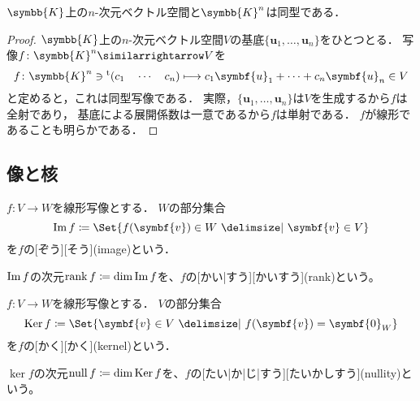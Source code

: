 \documentclass[../sotsu.tex]{subfiles}
\begin{document}
\begin{theorem}
    $\symbb{K}$上の$n$-次元ベクトル空間と$\symbb{K}^n$は同型である\cite{saito-lin-2007}．
\end{theorem}

\begin{proof}
    $\symbb{K}$上の$n$-次元ベクトル空間$V$の基底$\{\symbf{u}_1, \dots, \symbf{u}_n\}$をひとつとる．
    写像$f \colon \symbb{K}^n \similarrightarrow V$を
    \begin{equation*}
        f \colon \symbb{K}^n \ni \tp{(c_1 \quad \dotsm \quad c_n)}
            \longmapsto
            c_1 \symbf{u}_1 + \dots + c_n \symbf{u}_n \in V
    \end{equation*}
    と定めると，これは同型写像である．
    実際，$\{\symbf{u}_1, \dots, \symbf{u}_n\}$は$V$を生成するから$f$は全射であり，
    基底による展開係数は一意であるから$f$は単射である．
    $f$が線形であることも明らかである．
\end{proof}


\subsection{像と核}

\begin{definition}[像]
    \label{dfn:image-of-linear-map}
    \label{dfn:rank}
    $f \colon V \to W$を線形写像とする．
    $W$の部分集合
    \begin{equation}
        \image f  \coloneq  \Set{  f(\symbf{v}) \in W  \given  \symbf{v} \in V  }
    \end{equation}
    を$f$の[ぞう][そう](image)という．

    $\operatorname{Im} f$の次元$\operatorname{rank} f \coloneq \dim \operatorname{Im} f$を、$f$の[かい|すう][かいすう](rank)という\cite{miyake-lin-2008}。
\end{definition}

\begin{definition}[核]
    \label{dfn:kernel-of-linear-map}
    \label{dfn:nullity}
    $f \colon V \to W$を線形写像とする．
    $V$の部分集合
    \begin{equation}
        \ker f  \coloneq  \Set{  \symbf{v} \in V  \given  f(\symbf{v}) = \symbf{0}_W  }
    \end{equation}
    を$f$の[かく][かく](kernel)という．

    $\ker f$の次元$\operatorname{null} f \coloneq \dim \operatorname{Ker} f$を、$f$の[たい|か|じ|すう][たいかしすう](nullity)という\cite{miyake-lin-2008}。
\end{definition}
\end{document}
